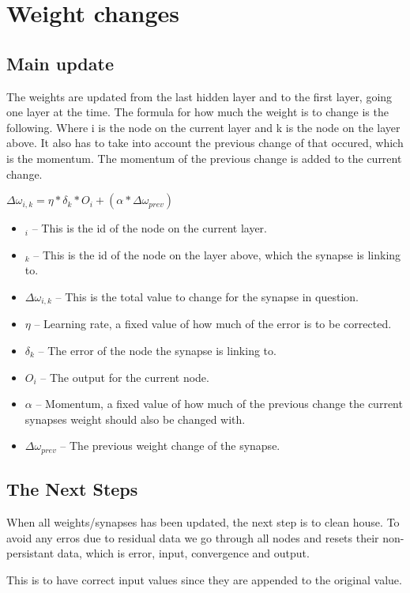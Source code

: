 \section{Weight changes}
\subsection{Main update}
The weights are updated from the last hidden layer and to the first layer, going
one layer at the time.  The formula for how much the weight is to change is the
following. Where i is the node on the current layer and k is the node on the
layer above.   It also has to take into account the previous change of that
occured, which is the momentum. The momentum of the previous change is added to
the current change.

{\large$\Delta\omega_{i,k}=\eta*\delta_k*O_i+(\alpha*\Delta\omega_{prev})$}
\begin{itemize}
\item	$_i$	-- This is the id of the node on the current layer.
\item	$_k$	-- This is the id of the node on the layer above, which the synapse is
	linking to.
\item	$\Delta\omega_{i,k}$	-- This is the total value to change for the synapse in
	question.
\item	$\eta$	-- Learning rate, a fixed value of how much of the error is to be
	corrected.
\item	$\delta_k$	-- The error of the node the synapse is linking to.
\item	$O_i$			-- The output for the current node.
\item	$\alpha$	-- Momentum, a fixed value of how much of the previous change the
	current synapses weight should also be changed with.
\item	$\Delta\omega_{prev}$ -- The previous weight change of the synapse.
\end{itemize}


\subsection{The Next Steps}
When all weights/synapses has been updated, the next step is to clean house. To
avoid any erros due to residual data we go through all nodes and resets their
non-persistant data, which is error, input, convergence and output.

This is to have correct input values since they are appended to the original
value.

